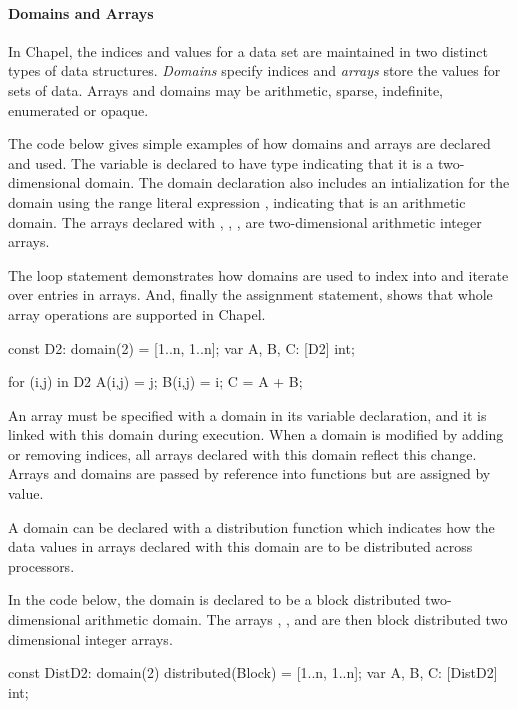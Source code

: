 \paragraph{Domains and Arrays}
In Chapel, the indices and values for a data set are maintained
in two distinct types of data structures.  \emph{Domains} specify indices
and \emph{arrays} store the values for sets of data.  Arrays and domains may
be arithmetic, sparse, indefinite, enumerated or opaque.

\begin{example}
The code below gives simple examples of how domains and arrays are declared
and used.
The variable  is declared to have type 
indicating that it is a two-dimensional domain.  The domain declaration
also includes an intialization for the domain using the range literal
expression ,
indicating that  is an arithmetic domain.  The arrays declared
with , , ,  are two-dimensional
arithmetic integer arrays.  

The  loop statement demonstrates
how domains are used to index into and iterate over entries in arrays.
And, finally the assignment statement,  shows that
whole array operations are supported in Chapel.

\begin{chapel}
const D2: domain(2) = [1..n, 1..n];
var A, B, C: [D2] int;

for (i,j) in D2 {
  A(i,j) = j;
  B(i,j) = i;
}
C = A + B;
\end{chapel}
\end{example}

An array must be specified with a domain in its variable declaration, and 
it is linked with this domain during execution.
When a domain is modified by adding or removing indices, all arrays 
declared with this domain reflect this change.  
Arrays and domains are passed by reference into functions but are
assigned by value.  

A domain can be declared with a distribution function which indicates how the 
data values in arrays declared with this domain are to be distributed across
processors.

\begin{example}
In the code below, the domain  is declared to be a 
block distributed two-dimensional arithmetic domain.
The arrays , , and  are then block distributed
two dimensional integer arrays.
\begin{chapel}
const DistD2: domain(2) distributed(Block) = [1..n, 1..n];
var A, B, C: [DistD2] int;
\end{chapel}
\end{example}

